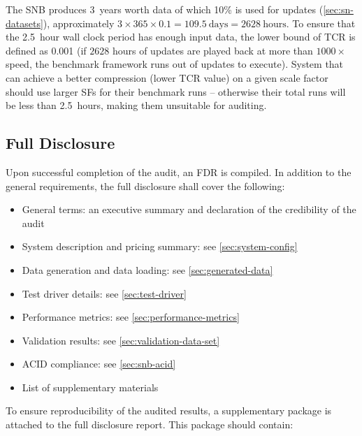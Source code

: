 The SNB \datagen produces 3~years worth data of which 10\% is used for updates (\autoref{sec:sn-datasets}), \ie approximately $3 \times 365 \times 0.1 = 109.5~\text{days} = 2628~\text{hours}$.
To ensure that the 2.5~hour wall clock period has enough input data, the lower bound of TCR is defined as 0.001 (if $2628$ hours of updates are played back at more than $1000\times$ speed, the benchmark framework runs out of updates to execute). System that can achieve a better compression (\ie lower TCR value) on a given scale factor should use larger SFs for their benchmark runs -- otherwise their total runs will be less than 2.5~hours, making them unsuitable for auditing.


\subsection{Full Disclosure}
Upon successful completion of the audit, an FDR is compiled. In addition to the general requirements, the full disclosure shall cover the following:

\begin{itemize}
    \item General terms: an executive summary and declaration of the credibility of the audit
    \item System description and pricing summary: see \autoref{sec:system-config}
    \item Data generation and data loading: see \autoref{sec:generated-data}
    \item Test driver details: see \autoref{sec:test-driver}
    \item Performance metrics: see \autoref{sec:performance-metrics}
    \item Validation results: see \autoref{sec:validation-data-set}
    \item ACID compliance: see \autoref{sec:snb-acid}
    \item List of supplementary materials
\end{itemize}

To ensure reproducibility of the audited results, a supplementary package is attached to the full disclosure report. This package should contain:

